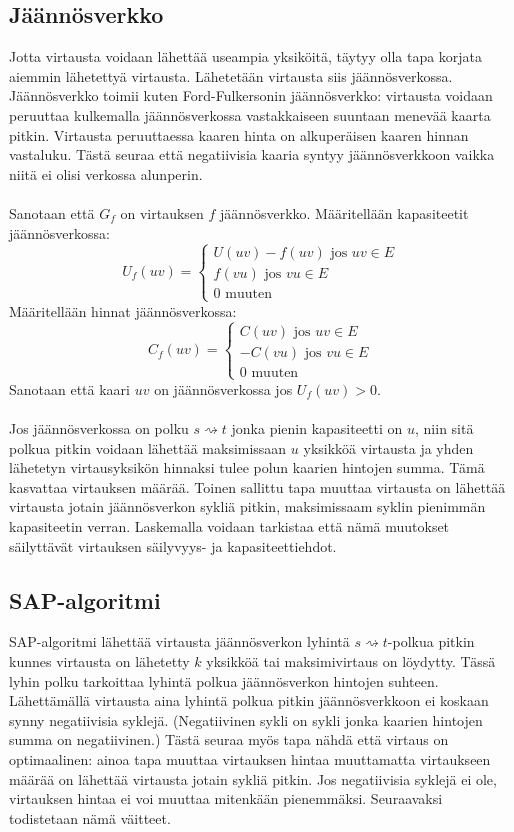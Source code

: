 \documentclass[a4paper, 11pt]{article}
\begin{document}
\subsection*{Jäännösverkko}
Jotta virtausta voidaan lähettää useampia yksiköitä, täytyy olla tapa korjata aiemmin lähetettyä
virtausta. Lähetetään virtausta siis jäännösverkossa. Jäännösverkko toimii kuten Ford-Fulkersonin
jäännösverkko: virtausta voidaan peruuttaa kulkemalla jäännösverkossa vastakkaiseen suuntaan
menevää kaarta pitkin. Virtausta peruuttaessa kaaren hinta on alkuperäisen kaaren hinnan vastaluku.
Tästä seuraa että negatiivisia kaaria syntyy jäännösverkkoon vaikka niitä ei olisi verkossa alunperin.\\\\
Sanotaan että $G_f$ on virtauksen $f$ jäännösverkko. Määritellään kapasiteetit
jäännösverkossa:\\
$$U_f(uv) = \begin{cases} U(uv) - f(uv) \text{ jos } uv \in E\\
f(vu) \text{ jos } vu \in E\\
0 \text{ muuten}
\end{cases}$$
Määritellään hinnat jäännösverkossa:\\
$$C_f(uv) = \begin{cases} C(uv) \text{ jos } uv \in E\\
-C(vu) \text{ jos } vu \in E\\
0 \text{ muuten}
\end{cases}$$
Sanotaan että kaari $uv$ on jäännösverkossa jos $U_f(uv) > 0$.\\\\
\noindent
Jos jäännösverkossa on polku $s \rightsquigarrow t$ jonka pienin kapasiteetti 
on $u$, niin sitä polkua pitkin voidaan lähettää maksimissaan $u$ yksikköä
virtausta ja yhden lähetetyn virtausyksikön hinnaksi tulee polun kaarien hintojen summa.
Tämä kasvattaa virtauksen määrää. Toinen sallittu tapa muuttaa virtausta
on lähettää virtausta jotain jäännösverkon sykliä pitkin, maksimissaam syklin pienimmän
kapasiteetin verran. Laskemalla voidaan tarkistaa että nämä muutokset säilyttävät
virtauksen säilyvyys- ja kapasiteettiehdot.
\subsection*{SAP-algoritmi}
\noindent
SAP-algoritmi lähettää virtausta jäännösverkon lyhintä $s \rightsquigarrow t$-polkua
pitkin kunnes virtausta on lähetetty $k$ yksikköä tai maksimivirtaus on löydytty.
Tässä lyhin polku tarkoittaa lyhintä polkua jäännösverkon hintojen suhteen.
Lähettämällä virtausta aina lyhintä polkua pitkin jäännösverkkoon ei koskaan synny
negatiivisia syklejä. (Negatiivinen sykli on sykli jonka kaarien hintojen summa on negatiivinen.) 
Tästä seuraa myös tapa nähdä että virtaus on optimaalinen:
ainoa tapa muuttaa virtauksen hintaa muuttamatta virtaukseen määrää on lähettää virtausta
jotain sykliä pitkin. Jos negatiivisia syklejä ei ole, virtauksen hintaa ei voi muuttaa
mitenkään pienemmäksi.
Seuraavaksi todistetaan nämä väitteet.
\noindent
\end{document}
